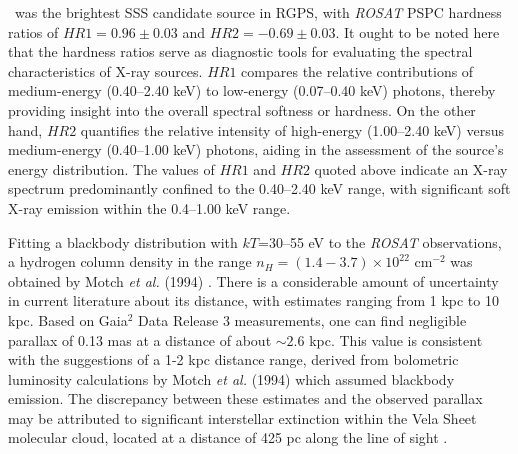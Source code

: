 	\source\ was the brightest SSS candidate source in RGPS, with \textit{ROSAT} PSPC hardness ratios of $HR1=0.96\pm 0.03$ and $HR2=-0.69\pm 0.03$. It ought to be noted here that the hardness ratios serve as diagnostic tools for evaluating the spectral characteristics of X-ray sources. $HR1$ compares the relative contributions of medium-energy (0.40--2.40 keV) to low-energy (0.07--0.40 keV) photons, thereby providing insight into the overall spectral softness or hardness. On the other hand, $HR2$ quantifies the relative intensity of high-energy (1.00--2.40 keV) versus medium-energy (0.40--1.00 keV) photons, aiding in the assessment of the source's energy distribution. The values of $HR1$ and $HR2$ quoted above indicate an X-ray spectrum predominantly confined to the 0.40--2.40 keV range, with significant soft X-ray emission within the 0.4--1.00 keV range. %
	
	Fitting a blackbody distribution with $kT$=30--55 eV to the \textit{ROSAT} observations, a hydrogen column density in the range $n_H=(1.4-3.7)\times 10^{22}$ cm$^{-2}$ was obtained by Motch \textit{et al.} (1994) \cite{motch1994}. There is a considerable amount of uncertainty in current literature about its distance, with estimates ranging from 1 kpc to 10 kpc. Based on Gaia$^2$ Data Release 3 measurements, one can find negligible parallax of 0.13 mas at a distance of about $\sim 2.6$ kpc. This value is consistent with the suggestions of a 1-2 kpc distance range, derived from bolometric luminosity calculations by Motch \textit{et al.} (1994) \cite{motch1994} which assumed blackbody emission. The discrepancy between these estimates and the observed parallax may be attributed to significant interstellar extinction within the Vela Sheet molecular cloud, located at a distance of 425 pc along the line of sight \cite{grabelsky1987}. %
	
